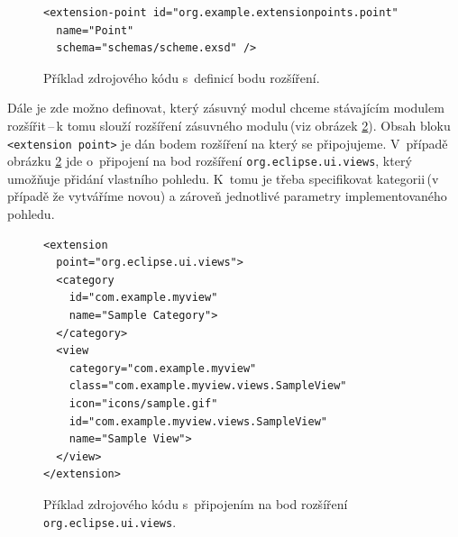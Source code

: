       \lstset{language=xml}
      \begin{figure}
	\begin{lstlisting}[frame=single]
<extension-point id="org.example.extensionpoints.point"
  name="Point"
  schema="schemas/scheme.exsd" />
	\end{lstlisting}
	\caption{Příklad zdrojového kódu s~definicí bodu rozšíření.}
	\label{code:extension_point_declaration}
	\vspace{1em}
      \end{figure}

      Dále je zde možno definovat, který zásuvný modul chceme stávajícím modulem rozšířit\,--\,k tomu slouží rozšíření zásuvného modulu\,(viz obrázek \ref{code:extension_declaration}). Obsah bloku \texttt{<extension point>} je dán bodem rozšíření na který se připojujeme. V~případě obrázku \ref{code:extension_declaration} jde o~připojení na bod rozšíření \texttt{org.eclipse.ui.views}, který umožňuje přidání vlastního pohledu. K~tomu je třeba specifikovat kategorii\,(v případě že vytváříme novou) a zároveň jednotlivé parametry implementovaného pohledu.

      \begin{figure}
	\begin{lstlisting}[frame=single]
<extension
  point="org.eclipse.ui.views">
  <category
    id="com.example.myview"
    name="Sample Category">
  </category>
  <view
    category="com.example.myview"
    class="com.example.myview.views.SampleView"
    icon="icons/sample.gif"
    id="com.example.myview.views.SampleView"
    name="Sample View">
  </view>
</extension>
	\end{lstlisting}
	\caption{Příklad zdrojového kódu s~připojením na bod rozšíření \texttt{org.eclipse.ui.views}.}
	\label{code:extension_declaration}
	\vspace{1em}
      \end{figure}